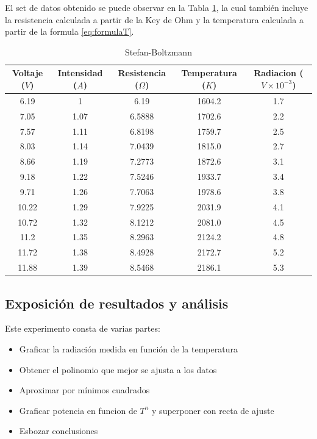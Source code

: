 \documentclass[a4paper]{article}
\begin{document}
El set de datos obtenido se puede observar en la Tabla \ref{tabla1}, la cual también incluye la resistencia calculada a partir de la Key de Ohm y la temperatura calculada a partir de la formula \ref{eq:formulaT}.

\begin{table}[h!]
\centering
\begin{tabular}{c c|c c|c}
Voltaje ($V$) & Intensidad ($A$) & Resistencia ($\Omega$) & Temperatura ($K$) & Radiacion ($V\times10^{-3}$) \\\hline
6.19 & 1 & 6.19 & 1604.2 & 1.7\\
7.05 & 1.07 & 6.5888 & 1702.6 & 2.2\\
7.57 & 1.11 & 6.8198 & 1759.7 & 2.5\\
8.03 & 1.14 & 7.0439 & 1815.0 & 2.7\\
8.66 & 1.19 & 7.2773 & 1872.6 & 3.1\\
9.18 & 1.22 & 7.5246 & 1933.7 & 3.4\\
9.71 & 1.26 & 7.7063 & 1978.6 & 3.8\\
10.22 & 1.29 & 7.9225 & 2031.9 & 4.1\\
10.72 & 1.32 & 8.1212 & 2081.0 & 4.5\\
11.2 & 1.35 & 8.2963 & 2124.2 & 4.8\\
11.72 & 1.38 & 8.4928 & 2172.7 & 5.2\\
11.88 & 1.39 & 8.5468 & 2186.1 & 5.3\\
\end{tabular}
\caption{\label{tabla1}Stefan-Boltzmann}
\end{table}


\subsection{Exposición de resultados y análisis}

Este experimento consta de varias partes:

\begin{itemize}
    \item Graficar la radiación medida en función de la temperatura
    \item Obtener el polinomio que mejor se ajusta a los datos
    \item Aproximar por mínimos cuadrados
    \item Graficar potencia en funcion de $T^n$ y superponer con recta de ajuste
    \item Esbozar conclusiones
\end{itemize}
\end{document}
